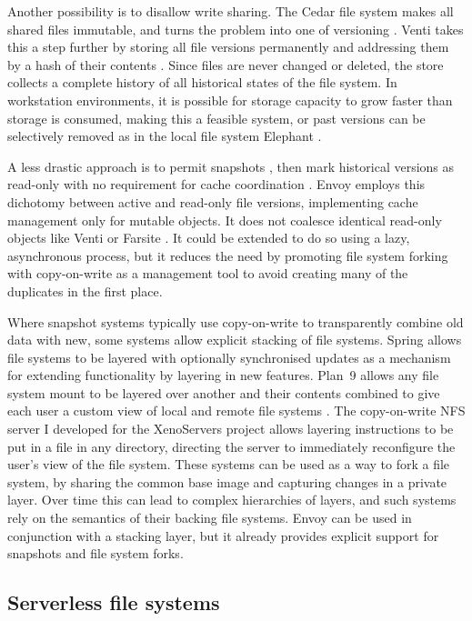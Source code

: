 Another possibility is to disallow write sharing. The Cedar file system \cite{schroeder} makes all shared files immutable, and turns the problem into one of versioning \cite{gifford}. Venti takes this a step further by storing all file versions permanently and addressing them by a hash of their contents \cite{quinlan}. Since files are never changed or deleted, the store collects a complete history of all historical states of the file system. In workstation environments, it is possible for storage capacity to grow faster than storage is consumed, making this a feasible system, or past versions can be selectively removed as in the local file system Elephant \cite{santry}.

A less drastic approach is to permit snapshots \cite{hitz}, then mark historical versions as read-only with no requirement for cache coordination \cite{warfield}. Envoy employs this dichotomy between active and read-only file versions, implementing cache management only for mutable objects. It does not coalesce identical read-only objects like Venti or Farsite \cite{douceur02}. It could be extended to do so using a lazy, asynchronous process, but it reduces the need by promoting file system forking with copy-on-write as a management tool to avoid creating many of the duplicates in the first place.

Where snapshot systems typically use copy-on-write to transparently combine old data with new, some systems allow explicit stacking of file systems. Spring \cite{khalidi} allows file systems to be layered with optionally synchronised updates as a mechanism for extending functionality by layering in new features. Plan~9 \cite{pike90} allows any file system mount to be layered over another and their contents combined to give each user a custom view of local and remote file systems \cite{pike92}. The copy-on-write NFS server I developed for the XenoServers project \cite{kotsovinos04b} allows layering instructions to be put in a file in any directory, directing the server to immediately reconfigure the user's view of the file system. These systems can be used as a way to fork a file system, by sharing the common base image and capturing changes in a private layer. Over time this can lead to complex hierarchies of layers, and such systems rely on the semantics of their backing file systems. Envoy can be used in conjunction with a stacking layer, but it already provides explicit support for snapshots and file system forks.

\subsection{Serverless file systems}

